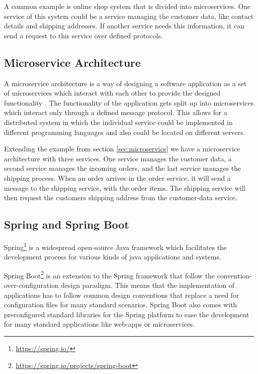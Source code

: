 A common example is online shop system that is divided into microservices.
One service of this system could be a service managing the customer data, like contact details and shipping addresses.
If another service needs this information, it can send a request to this service over defined protocols.


\subsection{Microservice Architecture}
\label{sec:microservice_architecture}
A microservice architecture is a way of designing a software application as a set of microservices which interact with each other to provide the designed functionality \cite{dragoniMicroservicesYesterdayToday2017, MicroservicesHttpsMartinfowler}.
The functionality of the application gets split up into microservices which interact only through a defined message protocol.
This allows for a distributed system in which the individual service could be implemented in different programming languages and also could be located on different servers.

Extending the example from section \ref{sec:microservice} we have a microservice architecture with three services.
One service manages the customer data, a second service manages the incoming orders, and the last service manages the shipping process.
When an order arrives in the order service, it will send a message to the shipping service, with the order items.
The shipping service will then request the customers shipping address from the customer-data service.


\subsection{Spring and Spring Boot}
\label{sec:spring}
Spring\footnote{\url{https://spring.io/}} is a widespread open-source Java framework which facilitates the development process for various kinds of java applications and systems.

Spring Boot\footnote{\url{https://spring.io/projects/spring-boot}} is an extension to the Spring framework that follow the convention-over-configuration design paradigm.
This means that the implementation of applications has to follow common design conventions that replace a need for configuration files for many standard scenarios.
Spring Boot also comes with preconfigured standard libraries for the Spring platform to ease the development for many standard applications like web-apps or microservices.


